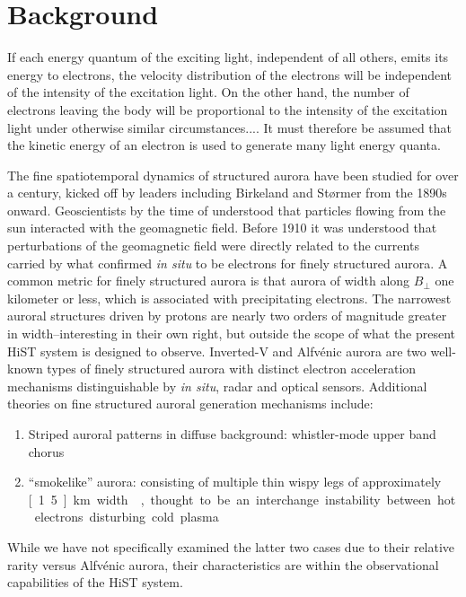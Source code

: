 
\chapter{Background}
\label{chapter:physics}
\thispagestyle{myheadings}

\graphicspath{{Physics/}}

\epigraph{If each energy quantum of the exciting light, independent of all others, emits its energy to electrons, the velocity distribution of the electrons will be independent of the intensity of the excitation light. On the other hand, the number of electrons leaving the body will be proportional to the intensity of the excitation light under otherwise similar circumstances.... It must therefore be assumed that the kinetic energy of an electron is used to generate many light energy quanta.}{\citet{einstein1905}}

The fine spatiotemporal dynamics of structured aurora have been studied for over a century, kicked off by leaders including Birkeland and Størmer from the 1890s onward.
Geoscientists by the time of \citet{birkeland1908} understood that particles flowing from the sun interacted with the geomagnetic field.
Before 1910 it was understood that perturbations of the geomagnetic field were directly related to the currents carried by what \citet{mcilwain1960} confirmed \textit{in situ} to be electrons for finely structured aurora.
A common metric for finely structured aurora is that aurora of width along $B_\perp$ one kilometer or less, which is associated with precipitating electrons.
The narrowest auroral structures driven by protons are nearly two orders of magnitude greater in width--interesting in their own right, but outside the scope of what the present HiST system is designed to observe.
Inverted-V and Alfvénic aurora are two well-known types of finely structured aurora with distinct electron acceleration mechanisms distinguishable by \textit{in situ}, radar and optical sensors.
Additional theories on fine structured auroral generation mechanisms include:
\begin{enumerate}
    \item Striped auroral patterns in diffuse background: whistler-mode upper band chorus \citep{nishiyama2012,sergienko2008}  
    \item ``smokelike'' aurora: consisting of multiple thin wispy legs of approximately \unit[1..5]{km} width \citep{ebihara2010}, thought to be an interchange instability between hot electrons disturbing cold plasma
\end{enumerate} 
While we have not specifically examined the latter two cases due to their relative rarity versus Alfvénic aurora, their characteristics are within the observational capabilities of the HiST system.

